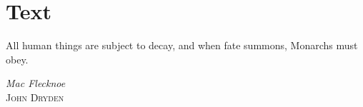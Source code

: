 \chapter{Text}
\label{ch:ch2}

\begin{singlespace} %
	\epigraph{All human things are subject to decay, and when fate summons, Monarchs must obey.}{\textit{Mac Flecknoe} \\ \textsc{John Dryden}}
\end{singlespace}

\lipsum[5-6]